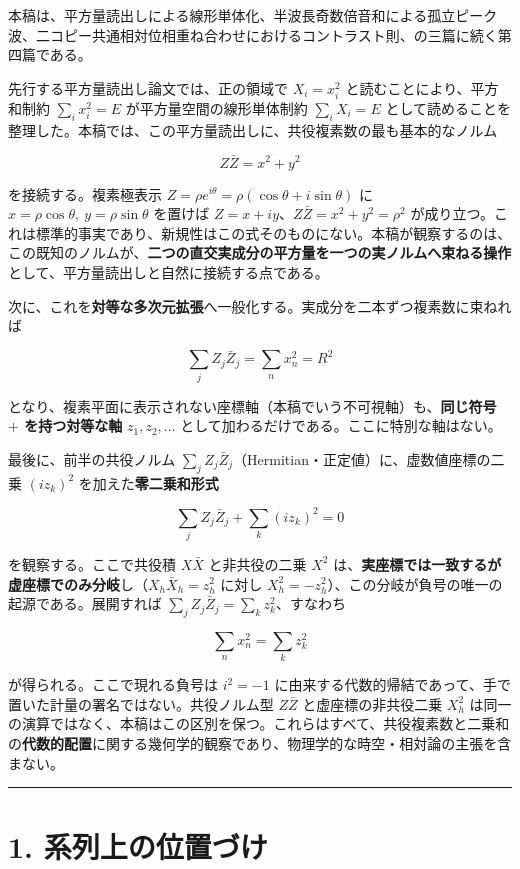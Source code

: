 \documentclass[11pt,a4paper]{ltjsarticle}
\begin{document}
本稿は、平方量読出しによる線形単体化、半波長奇数倍音和による孤立ピーク波、二コピー共通相対位相重ね合わせにおけるコントラスト則、の三篇に続く第四篇である。

先行する平方量読出し論文では、正の領域で \(X_i=x_i^2\)
と読むことにより、平方和制約 \(\sum_i x_i^2=E\)
が平方量空間の線形単体制約 \(\sum_i X_i=E\)
として読めることを整理した。本稿では、この平方量読出しに、共役複素数の最も基本的なノルム

\[
Z\bar Z=x^2+y^2
\]

を接続する。複素極表示
\(Z=\rho e^{i\theta}=\rho(\cos\theta+i\sin\theta)\) に
\(x=\rho\cos\theta,\ y=\rho\sin\theta\) を置けば
\(Z=x+iy\)、\(Z\bar Z=x^2+y^2=\rho^2\)
が成り立つ。これは標準的事実であり、新規性はこの式そのものにない。本稿が観察するのは、この既知のノルムが、\textbf{二つの直交実成分の平方量を一つの実ノルムへ束ねる操作}として、平方量読出しと自然に接続する点である。

次に、これを\textbf{対等な多次元拡張}へ一般化する。実成分を二本ずつ複素数に束ねれば

\[
\sum_j Z_j\bar Z_j=\sum_n x_n^2=R^2
\]

となり、複素平面に表示されない座標軸（本稿でいう不可視軸）も、\textbf{同じ符号
\(+\) を持つ対等な軸} \(z_1,z_2,\dots\)
として加わるだけである。ここに特別な軸はない。

最後に、前半の共役ノルム
\(\sum_j Z_j\bar Z_j\)（Hermitian・正定値）に、虚数値座標の二乗
\((i z_k)^2\) を加えた\textbf{零二乗和形式}

\[
\sum_j Z_j\bar Z_j+\sum_k (i z_k)^2=0
\]

を観察する。ここで共役積 \(X\bar X\) と非共役の二乗 \(X^2\)
は、\textbf{実座標では一致するが虚座標でのみ分岐}し（\(X_h\bar X_h=z_h^2\)
に対し \(X_h^2=-z_h^2\)）、この分岐が負号の唯一の起源である。展開すれば
\(\sum_j Z_j\bar Z_j=\sum_k z_k^2\)、すなわち

\[
\sum_n x_n^2=\sum_k z_k^2
\]

が得られる。ここで現れる負号は \(i^2=-1\)
に由来する代数的帰結であって、手で置いた計量の署名ではない。共役ノルム型
\(Z\bar Z\) と虚座標の非共役二乗 \(X_h^2\)
は同一の演算ではなく、本稿はこの区別を保つ。これらはすべて、共役複素数と二乗和の\textbf{代数的配置}に関する幾何学的観察であり、物理学的な時空・相対論の主張を含まない。

\begin{center}\rule{0.5\linewidth}{0.5pt}\end{center}

\section{1.
系列上の位置づけ}\label{ux7cfbux5217ux4e0aux306eux4f4dux7f6eux3065ux3051}
\end{document}
